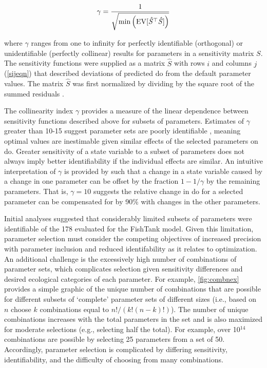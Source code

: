 \documentclass[letterpaper,12pt,oneside]{article}\usepackage[]{graphicx}\usepackage[]{color}
\begin{document}
\begin{equation} \label{gameq}
\gamma = \frac{1} {\sqrt{ \min \left(\rm{EV}[\mathit{\hat{S}}^\top \mathit{\hat{S}}]\right)}}
\end{equation}

\noindent where $\gamma$ ranges from one to infinity for perfectly identifiable (orthogonal) or unidentifiable (perfectly collinear) results for parameters in a sensitivity matrix $S$.  The sensitivity functions were supplied as a matrix $\hat{S}$ with rows $i$ and columns $j$ (\cref{sijeqn}) that described deviations of predicted \ac{do} from the default parameter values.  The matrix $\hat{S}$ was first normalized by dividing by the square root of the summed residuals \citep{Omlin01,Soetaert10}. 

The collinearity index $\gamma$ provides a measure of the linear dependence between sensitivity functions described above for subsets of parameters. Estimates of $\gamma$ greater than 10-15 suggest parameter sets are poorly identifiable \citep{Brun01,Omlin01}, meaning optimal values are inestimable given similar effects of the selected parameters on \ac{do}. Greater sensitivity of a state variable to a subset of parameters does not always imply better identifiability if the individual effects are similar.  An intuitive interpretation of $\gamma$ is provided by \citet{Brun01} such that a change in a state variable caused by a change in one parameter can be offset by the fraction $1 - 1/\gamma$ by the remaining parameters.  That is, $\gamma = 10$ suggests the relative change in \ac{do} for a selected parameter can be compensated for by 90\% with changes in the other parameters. 

Initial analyses suggested that considerably limited subsets of parameters were identifiable of the 178 evaluated for the FishTank model.  Given this limitation, parameter selection must consider the competing objectives of increased precision with parameter inclusion and reduced identifability as it relates to optimization.  An additional challenge is the excessively high number of combinations of parameter sets, which complicates selection given sensitivity differences and desired ecological categories of each parameter.  For example, \cref{fig:combnex} provides a simple graphic of the unique number of combinations that are possible for different subsets of `complete' parameter sets of different sizes (i.e., based on $n$ choose $k$ combinations equal to $n!/\left(k!\left(n-k\right)!\right)$).  The number of unique combinations increases with the total parameters in the set and is also maximized for moderate selections (e.g., selecting half the total).  For example, over 10$^{14}$ combinations are possible by selecting 25 parameters from a set of 50.  Accordingly, parameter selection is complicated by differing sensitivity, identifiability, and the difficulty of choosing from many combinations.
\end{document}
